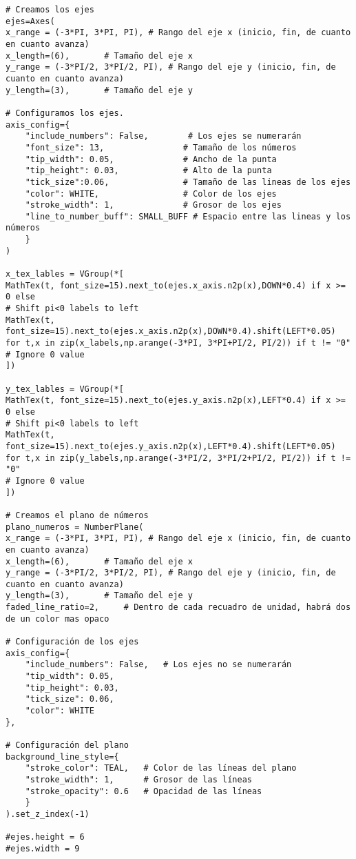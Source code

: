 \begin{longlisting}
\begin{verbatim}
# Creamos los ejes
ejes=Axes(
x_range = (-3*PI, 3*PI, PI), # Rango del eje x (inicio, fin, de cuanto en cuanto avanza)
x_length=(6),       # Tamaño del eje x
y_range = (-3*PI/2, 3*PI/2, PI), # Rango del eje y (inicio, fin, de cuanto en cuanto avanza)
y_length=(3),       # Tamaño del eje y
		
# Configuramos los ejes.
axis_config={
	"include_numbers": False,        # Los ejes se numerarán
	"font_size": 13,                # Tamaño de los números
	"tip_width": 0.05,              # Ancho de la punta
	"tip_height": 0.03,             # Alto de la punta
	"tick_size":0.06,               # Tamaño de las lineas de los ejes
	"color": WHITE,                 # Color de los ejes
	"stroke_width": 1,              # Grosor de los ejes
	"line_to_number_buff": SMALL_BUFF # Espacio entre las lineas y los números
	}       
)
		
x_tex_lables = VGroup(*[
MathTex(t, font_size=15).next_to(ejes.x_axis.n2p(x),DOWN*0.4) if x >= 0 else
# Shift pi<0 labels to left
MathTex(t, font_size=15).next_to(ejes.x_axis.n2p(x),DOWN*0.4).shift(LEFT*0.05)
for t,x in zip(x_labels,np.arange(-3*PI, 3*PI+PI/2, PI/2)) if t != "0"
# Ignore 0 value
])

y_tex_lables = VGroup(*[
MathTex(t, font_size=15).next_to(ejes.y_axis.n2p(x),LEFT*0.4) if x >= 0 else
# Shift pi<0 labels to left
MathTex(t, font_size=15).next_to(ejes.y_axis.n2p(x),LEFT*0.4).shift(LEFT*0.05)
for t,x in zip(y_labels,np.arange(-3*PI/2, 3*PI/2+PI/2, PI/2)) if t != "0"
# Ignore 0 value
])

# Creamos el plano de números
plano_numeros = NumberPlane(
x_range = (-3*PI, 3*PI, PI), # Rango del eje x (inicio, fin, de cuanto en cuanto avanza)
x_length=(6),       # Tamaño del eje x
y_range = (-3*PI/2, 3*PI/2, PI), # Rango del eje y (inicio, fin, de cuanto en cuanto avanza)
y_length=(3),       # Tamaño del eje y
faded_line_ratio=2,     # Dentro de cada recuadro de unidad, habrá dos de un color mas opaco

# Configuración de los ejes
axis_config={
	"include_numbers": False,   # Los ejes no se numerarán
	"tip_width": 0.05, 
	"tip_height": 0.03, 
	"tick_size": 0.06, 
	"color": WHITE
},
		
# Configuración del plano
background_line_style={
	"stroke_color": TEAL,   # Color de las líneas del plano
	"stroke_width": 1,      # Grosor de las líneas
	"stroke_opacity": 0.6   # Opacidad de las líneas
	}
).set_z_index(-1)
		
#ejes.height = 6
#ejes.width = 9


\end{verbatim}
\end{longlisting}
